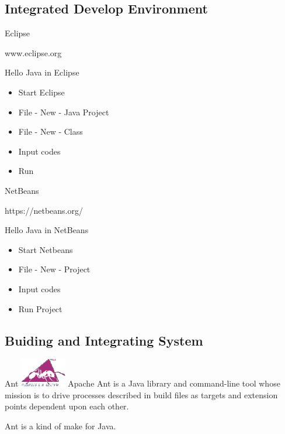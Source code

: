 \documentclass[UTF8]{beamer}
\begin{document}
\subsection{Integrated Develop Environment}
\begin{frame}[t]{Eclipse}
  \centerline{www.eclipse.org}
\end{frame}

\begin{frame}[t]{Hello Java in Eclipse}
  \begin{itemize}
    \item Start Eclipse
    \item File - New - Java Project
    \item File - New - Class
    \item Input codes
    \item Run
  \end{itemize}
\end{frame}

\begin{frame}[t]{NetBeans}
  \centerline{https://netbeans.org/}
\end{frame}

\begin{frame}[t]{Hello Java in NetBeans}
  \begin{itemize}
    \item Start Netbeans
    \item File - New - Project
    \item Input codes
    \item Run Project
  \end{itemize}
\end{frame}


\subsection{Buiding and Integrating System}

\begin{frame}[t]{Ant}
\includegraphics[width=2cm]{ant.png}
Apache Ant is a Java library and command-line tool whose mission is to drive
processes described in build files as targets and extension points dependent
upon each other.

Ant is a kind of make for Java.

\end{frame}
\end{document}
